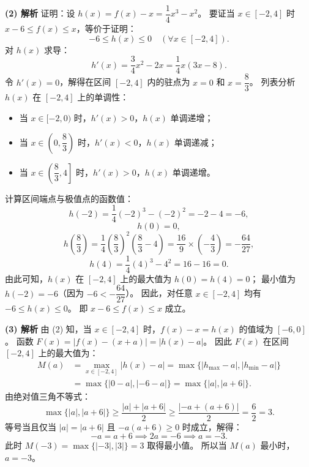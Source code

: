 \begin{answer}
\textbf{(2) 解析}
证明：设 $h(x) = f(x) - x = \dfrac{1}{4}x^3 - x^2$。
要证当 $x \in [-2, 4]$ 时 $x - 6 \leqslant f(x) \leqslant x$，等价于证明：
\nopagebreak[4]
\[-6 \leqslant h(x) \leqslant 0 \quad (\forall x \in [-2, 4]).\]
对 $h(x)$ 求导：
\nopagebreak[4]
\[h'(x) = \frac{3}{4}x^2 - 2x = \frac{1}{4}x(3x - 8).\]
令 $h'(x) = 0$，解得在区间 $[-2, 4]$ 内的驻点为 $x = 0$ 和 $x = \dfrac{8}{3}$。
列表分析 $h(x)$ 在 $[-2, 4]$ 上的单调性：
\begin{itemize}
\item 当 $x \in [-2, 0)$ 时，$h'(x) > 0$，$h(x)$ 单调递增；
\item 当 $x \in \left(0, \dfrac{8}{3}\right)$ 时，$h'(x) < 0$，$h(x)$ 单调递减；
\item 当 $x \in \left(\dfrac{8}{3}, 4\right]$ 时，$h'(x) > 0$，$h(x)$ 单调递增。
\end{itemize}
计算区间端点与极值点的函数值：
\nopagebreak[4]
\[h(-2) = \frac{1}{4}(-2)^3 - (-2)^2 = -2 - 4 = -6,\]
\nopagebreak[4]
\[h(0) = 0,\]
\nopagebreak[4]
\[h\left(\frac{8}{3}\right) = \frac{1}{4}\left(\frac{8}{3}\right)^2 \left(\frac{8}{3} - 4\right) = \frac{16}{9} \times \left(-\frac{4}{3}\right) = -\frac{64}{27},\]
\nopagebreak[4]
\[h(4) = \frac{1}{4}(4)^3 - 4^2 = 16 - 16 = 0.\]
由此可知，$h(x)$ 在 $[-2, 4]$ 上的最大值为 $h(0) = h(4) = 0$；
最小值为 $h(-2) = -6$（因为 $-6 < -\dfrac{64}{27}$）。
因此，对任意 $x \in [-2, 4]$ 均有 $-6 \leqslant h(x) \leqslant 0$。
即 $x - 6 \leqslant f(x) \leqslant x$ 成立。

\textbf{(3) 解析}
由 (2) 知，当 $x \in [-2, 4]$ 时，$f(x) - x = h(x)$ 的值域为 $[-6, 0]$。
函数 $F(x) = |f(x) - (x + a)| = |h(x) - a|$。
因此 $F(x)$ 在区间 $[-2, 4]$ 上的最大值为：
\nopagebreak[4]
\[\begin{aligned}
M(a) &= \max_{x \in [-2, 4]} |h(x) - a| = \max\{|h_{\max} - a|, |h_{\min} - a|\} \\
&= \max\{|0 - a|, |-6 - a|\} = \max\{|a|, |a + 6|\}.
\end{aligned}\]
由绝对值三角不等式：
\nopagebreak[4]
\[\max\{|a|, |a + 6|\} \geqslant \frac{|a| + |a + 6|}{2} \geqslant \frac{|-a + (a + 6)|}{2} = \frac{6}{2} = 3.\]
等号当且仅当 $|a| = |a + 6|$ 且 $-a(a + 6) \geqslant 0$ 时成立，解得：
\nopagebreak[4]
\[-a = a + 6 \implies 2a = -6 \implies a = -3.\]
此时 $M(-3) = \max\{|-3|, |3|\} = 3$ 取得最小值。
所以当 $M(a)$ 最小时，$a = -3$。




\end{answer}
